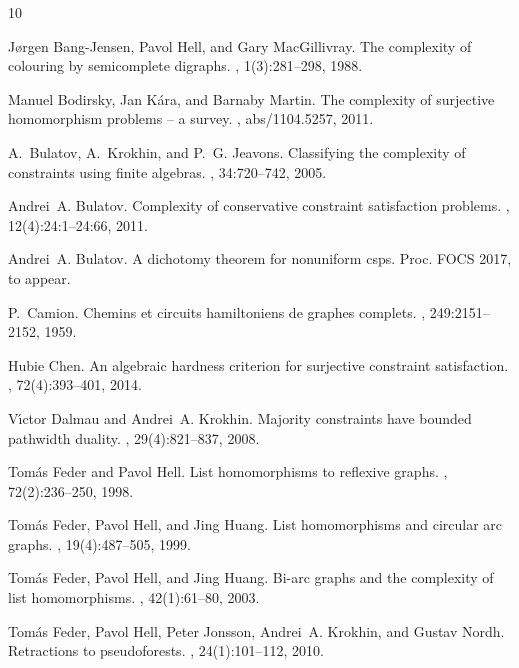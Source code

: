 \documentclass[a4paper,12pt]{article}
\theoremstyle{remark}
\begin{document}
%
\begin{thebibliography}{10}

J{\o}rgen Bang-Jensen, Pavol Hell, and Gary MacGillivray.
\newblock The complexity of colouring by semicomplete digraphs.
, 1(3):281--298, 1988.

Manuel Bodirsky, Jan K{\'a}ra, and Barnaby Martin.
\newblock The complexity of surjective homomorphism problems -- a survey.
, abs/1104.5257, 2011.

A.~Bulatov, A.~Krokhin, and P.~G. Jeavons.
\newblock Classifying the complexity of constraints using finite algebras.
, 34:720--742, 2005.

Andrei~A. Bulatov.
\newblock Complexity of conservative constraint satisfaction problems.
, 12(4):24:1--24:66, 2011.


Andrei~A. Bulatov.
\newblock A dichotomy theorem for nonuniform csps.
\newblock Proc. FOCS 2017, to appear.

P.~Camion.
\newblock Chemins et circuits hamiltoniens de graphes complets.
, 249:2151--2152, 1959.

Hubie Chen.
\newblock An algebraic hardness criterion for surjective constraint
  satisfaction.
, 72(4):393--401, 2014.


V\'{\i}ctor Dalmau and Andrei~A. Krokhin.
\newblock Majority constraints have bounded pathwidth duality.
, 29(4):821--837, 2008.

Tom{\'a}s Feder and Pavol Hell.
\newblock List homomorphisms to reflexive graphs.
, 72(2):236--250, 1998.

Tom{\'a}s Feder, Pavol Hell, and Jing Huang.
\newblock List homomorphisms and circular arc graphs.
, 19(4):487--505, 1999.

Tom{\'{a}}s Feder, Pavol Hell, and Jing Huang.
\newblock Bi-arc graphs and the complexity of list homomorphisms.
, 42(1):61--80, 2003.


Tom{\'a}s Feder, Pavol Hell, Peter Jonsson, Andrei~A. Krokhin, and Gustav
  Nordh.
\newblock Retractions to pseudoforests.
, 24(1):101--112, 2010.


\end{thebibliography}
\end{document}
